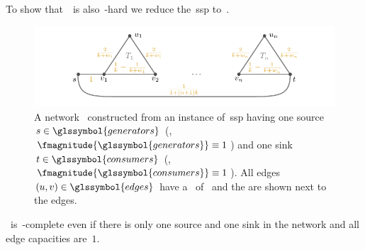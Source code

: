 To show that~\kmtsfp\ is also~\NP-hard we reduce the~\acrlong{ssp} to~\kmtsfp.
% 
\begin{figure}[tb!]
    \centering\includegraphics[page=1]
    {switchplacement/figures/hardness_proof.pdf}
    \vspace*{1.3mm}
    \caption[A network constructed from~\gls{ssp}.]{A
    network~ constructed from an instance of~\gls{ssp}
    having one source~$\source\in\glssymbol{generators}$ (\ie, $
    \fmagnitude{\glssymbol{generators}}\equiv 1$) and one
    sink~$\sink\in\glssymbol{consumers}$ (\ie, $
    \fmagnitude{\glssymbol{consumers}}\equiv 1$).
    All edges $ (\vertexa,\vertexb)\in\glssymbol{edges}$ have
    a~
    of~ and the
    are shown next to the edges.}
    \label{ch:switching:sec:complexity:fig:reduction}
\end{figure}
%
%
\begingroup
    
    \label{ch:switching:problems:subset-sum-decision-problem}
\endgroup
%
\begin{lemma}
    \kmtsfp\ is~\NP-complete even if there is only one source and one sink in
    the network and all edge capacities are~$1$.
\end{lemma}
% 
